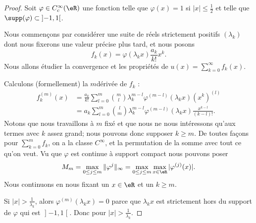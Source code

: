 \begin{proof}
	Soit \( \varphi\in C^{\infty}_c(\eR)\) une fonction telle que \( \varphi(x)=1\) si \( | x |\leq \frac{ 1 }{2}\) et telle que \( \supp(\varphi)\subset\mathopen] -1 , 1 \mathclose[\).

		Nous commençons par considérer une suite de réels strictement positifs \( (\lambda_k)\) dont nous fixerons une valeur précise plus tard, et nous posons
		\begin{equation}
			f_k(x)=\varphi(\lambda_k x)\frac{ a_k }{ k! }x^k.
		\end{equation}
		Nous allons étudier la convergence et les propriétés de \( u(x)=\sum_{k=0}^{\infty}f_k(x)\).

		Calculons (formellement) la \( m\)\ieme dérivée de \( f_k\) :
		\begin{subequations}
			\begin{align}
				f_k^{(m)}(x) & =\frac{ a_k }{ k! }\sum_{l=0}^{m}\binom{ m }{ l }\lambda_k^{m-l}\varphi^{(m-l)}(\lambda_kx)(x^k)^{(l)}  \\
				             & =a_k\sum_{l=0}^{m}\binom{ l }{ m }\lambda_k^{m-l}\varphi^{(m-l)}(\lambda_kx)\frac{ x^{k-l} }{ (k-l)! }.
			\end{align}
		\end{subequations}
		Notons que nous travaillons à \( m\) fixé et que nous ne nous intéressons qu'aux termes avec \( k\) assez grand; nous pouvons donc supposer \( k\geq m\). De toutes façons pour \( \sum_{k=0}^mf_k\), on a la classe \(  C^{\infty}\), et la permutation de la somme avec tout ce qu'on veut. Vu que \( \varphi\) est continue à support compact nous pouvons poser
		\begin{equation}
			M_m=\max_{0\leq j\leq m}\| \varphi^{j} \|_{\infty}=\max_{0\leq j\leq m}\max_{x\in \eR}| \varphi^{(j)}(x) |.
		\end{equation}
		Nous continuons en nous fixant un \( x\in \eR\) et un \( k\geq m\).

		Si \( | x |>\frac{1}{ \lambda_k }\), alors \( \varphi^{(m)}(\lambda_kx)=0\) parce que \( \lambda_kx\) est strictement hors du support de \( \varphi\) qui est \( \mathopen] -1 , 1 \mathclose[\). Donc pour \( | x |>\frac{1}{ \lambda_k }\).


\end{proof}

